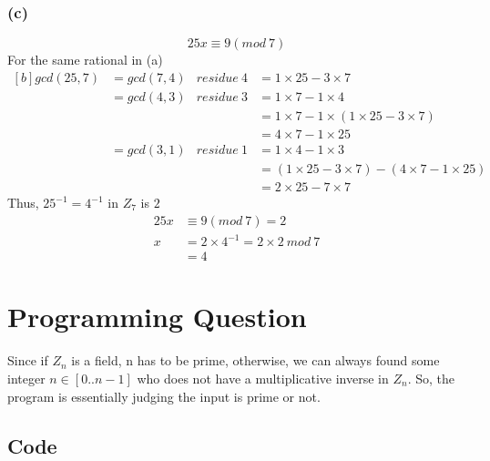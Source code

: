 \documentclass[11pt]{article}
\begin{document}
\subsubsection*{(c)}
$$25x\equiv 9(mod\ 7)$$
For the same rational in (a)\\
\begin{equation}
\begin{aligned}[b]
gcd(25,7)	&=gcd(7,4)	&residue\ 4	&= 1\times 25-3\times 7\\
			&=gcd(4,3)	&residue\ 3 &= 1\times 7-1\times 4\\
			&			&			&= 1\times 7-1\times (1\times 25-3\times 7)\\
			&			&			&= 4\times 7-1\times 25\\
			&=gcd(3,1)  &residue\ 1 &= 1\times 4-1\times 3\\
			&			&			&= (1\times 25-3\times 7)-(4\times 7 - 1\times 25)\\
			&			&			&= 2\times 25-7\times 7
\end{aligned}
\end{equation}
Thus, $25^{-1}=4^{-1}$ in $Z_{7}$ is $2$
\begin{equation}
\begin{split}
25x&\equiv 9(mod\ 7) = 2\\
x&=2\times 4^{-1}=2\times 2\ mod\ 7\\
&=4
\end{split}
\end{equation}
\pagebreak
\section*{Programming Question}
Since if $Z_n$ is a field, n has to be prime, otherwise, we can always found some integer $n\in[0..n-1]$
who does not have a multiplicative inverse in $Z_n$. So, the program is essentially judging the input is prime or not.
\subsection*{Code}  
\inputminted[breaklines]{python}{hw03.py}
\end{document}
